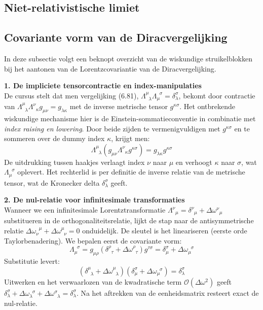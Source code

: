 \documentclass[a4paper,twoside]{article}
\theoremstyle{definition}
\theoremstyle{plain}
\begin{document}
\subsection{Niet-relativistische limiet}
\subsection{Covariante vorm van de Diracvergelijking}

In deze subsectie volgt een beknopt overzicht van de wiskundige struikelblokken bij het aantonen van de Lorentzcovariantie van de Diracvergelijking.

\textbf{1. De impliciete tensorcontractie en index-manipulaties} \\
De cursus stelt dat men vergelijking (6.81), $\Lambda^\mu_{\;\;\lambda} \Lambda_\mu^{\;\;\sigma} = \delta_\lambda^\sigma$, bekomt door contractie van $\Lambda^\mu_{\;\;\lambda} \Lambda^\nu_{\;\;\kappa} g_{\mu\nu} = g_{\lambda\kappa}$ met de inverse metrische tensor $g^{\kappa\sigma}$. Het ontbrekende wiskundige mechanisme hier is de Einstein-sommatieconventie in combinatie met \textit{index raising en lowering}.
Door beide zijden te vermenigvuldigen met $g^{\kappa\sigma}$ en te sommeren over de dummy index $\kappa$, krijgt men:
\begin{equation}
\Lambda^\mu_{\;\;\lambda} \left( g_{\mu\nu} \Lambda^\nu_{\;\;\kappa} g^{\kappa\sigma} \right) = g_{\lambda\kappa} g^{\kappa\sigma}
\end{equation}
De uitdrukking tussen haakjes verlaagt index $\nu$ naar $\mu$ en verhoogt $\kappa$ naar $\sigma$, wat $\Lambda_\mu^{\;\;\sigma}$ oplevert. Het rechterlid is per definitie de inverse relatie van de metrische tensor, wat de Kronecker delta $\delta_\lambda^\sigma$ geeft.

\textbf{2. De nul-relatie voor infinitesimale transformaties} \\
Wanneer we een infinitesimale Lorentztransformatie $\Lambda^\nu_{\;\;\mu} = \delta^\nu_{\;\;\mu} + \Delta\omega^\nu_{\;\;\mu}$ substitueren in de orthogonaliteitsrelatie, lijkt de stap naar de antisymmetrische relatie $\Delta\omega_\nu^{\;\;\mu} + \Delta\omega^\mu_{\;\;\nu} = 0$ onduidelijk. De sleutel is het lineariseren (eerste orde Taylorbenadering). We bepalen eerst de covariante vorm:
\begin{equation}
\Lambda_\mu^{\;\;\sigma} = g_{\mu\rho} (\delta^\rho_{\;\;\tau} + \Delta\omega^\rho_{\;\;\tau}) g^{\tau\sigma} = \delta_\mu^\sigma + \Delta\omega_\mu^{\;\;\sigma}
\end{equation}
Substitutie levert:
\begin{equation}
(\delta^\mu_{\;\;\lambda} + \Delta\omega^\mu_{\;\;\lambda})(\delta_\mu^\sigma + \Delta\omega_\mu^{\;\;\sigma}) = \delta_\lambda^\sigma
\end{equation}
Uitwerken en het verwaarlozen van de kwadratische term $\mathcal{O}(\Delta\omega^2)$ geeft $\delta_\lambda^\sigma + \Delta\omega_\lambda^{\;\;\sigma} + \Delta\omega^\sigma_{\;\;\lambda} = \delta_\lambda^\sigma$. Na het aftrekken van de eenheidsmatrix resteert exact de nul-relatie.
\end{document}
